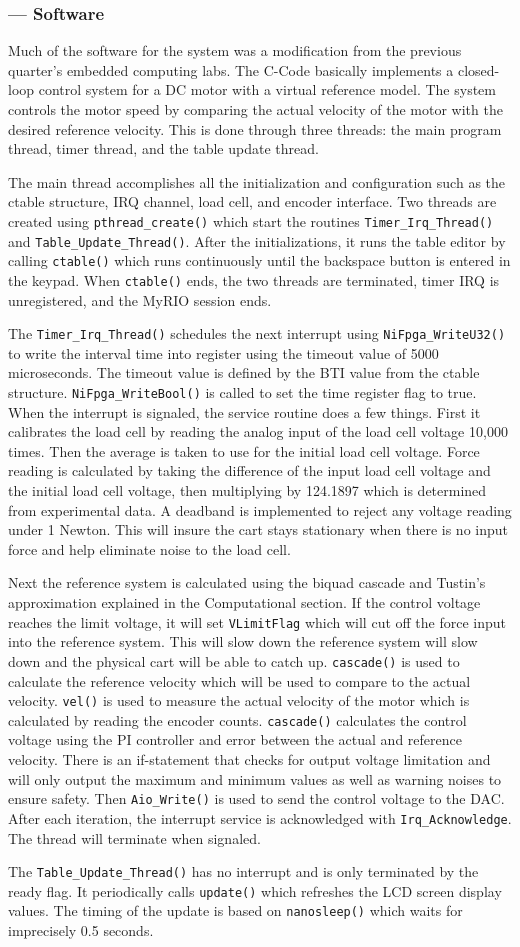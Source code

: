 \subsubsection*{ --- Software}
Much of the software for the system was a modification from the previous quarter's embedded computing labs. The C-Code basically implements a closed-loop control system for a DC motor with a virtual reference model. The system controls the motor speed by comparing the actual velocity of the motor with the desired reference velocity. This is done through three threads: the main program thread, timer thread, and the table update thread.

The main thread accomplishes all the initialization and configuration such as the ctable structure, IRQ channel, load cell, and encoder interface. Two threads are created using \verb|pthread_create()| which start the routines \verb|Timer_Irq_Thread()| and \verb|Table_Update_Thread()|. After the initializations, it runs the table editor by calling \verb|ctable()| which runs continuously until the backspace button is entered in the keypad. When \verb|ctable()| ends, the two threads are terminated, timer IRQ is unregistered, and the MyRIO session ends.

The \verb|Timer_Irq_Thread()| schedules the next interrupt using \verb|NiFpga_WriteU32()| to write the interval time into register using the timeout value of 5000 microseconds. The timeout value is defined by the BTI value from the ctable structure. \verb|NiFpga_WriteBool()| is called to set the time register flag to true. When the interrupt is signaled, the service routine does a few things. First it calibrates the load cell by reading the analog input of the load cell voltage 10,000 times. Then the average is taken to use for the initial load cell voltage. Force reading is calculated by taking the difference of the input load cell voltage and the initial load cell voltage, then multiplying by 124.1897 which is determined from experimental data. A deadband is implemented to reject any voltage reading under 1 Newton. This will insure the cart stays stationary when there is no input force and help eliminate noise to the load cell.

Next the reference system is calculated using the biquad cascade and Tustin's approximation explained in the Computational section. If the control voltage reaches the limit voltage, it will set \verb|VLimitFlag| which will cut off the force input into the reference system. This will slow down the reference system will slow down and the physical cart will be able to catch up. \verb|cascade()| is used to calculate the reference velocity which will be used to compare to the actual velocity. \verb|vel()| is used to measure the actual velocity of the motor which is calculated by reading the encoder counts. \verb|cascade()| calculates the control voltage using the PI controller and error between the actual and reference velocity. There is an if-statement that checks for output voltage limitation and will only output the maximum and minimum values as well as warning noises to ensure safety. Then \verb|Aio_Write()| is used to send the control voltage to the DAC. After each iteration, the interrupt service is acknowledged with \verb|Irq_Acknowledge|. The thread will terminate when signaled.

The \verb|Table_Update_Thread()| has no interrupt and is only terminated by the ready flag. It periodically calls \verb|update()| which refreshes the LCD screen display values. The timing of the update is based on \verb|nanosleep()| which waits for imprecisely 0.5 seconds. 